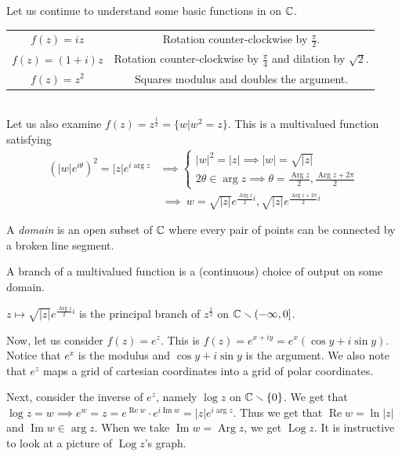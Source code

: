 \documentclass[11pt,leqno,oneside]{amsart}
\newcommand{\Arg}{\operatorname{Arg}}
\newcommand{\Log}{\operatorname{Log}}
\renewcommand{\Re}{\operatorname{Re}}
\renewcommand{\Im}{\operatorname{Im}}
\begin{document}
Let us continue to understand some basic functions in on ${\mathbb C}$. \\
\begin{tabular}{|c|c|}
    \hline
    $f(z) = iz$ & Rotation counter-clockwise by $\frac{\pi}{2}$. \\
    $f(z) = (1+i)z$ & Rotation counter-clockwise by $\frac{\pi}{4}$ and dilation by $\sqrt{2}$. \\
    $f(z) = z^2$ & Squares modulus and doubles the argument. \\
   \hline
\end{tabular} \\
Let us also examine $f(z) = z^{\frac{1}{2}} = \{w | w^2=z\}$. This is a multivalued function satisfying
\begin{align*}
    (|w|e^{i\theta})^2 = |z|e^{i \arg z} & \implies \begin{cases}
        |w|^2 = |z| \implies |w| = \sqrt{|z|} \\
        2\theta \in \arg z \implies \theta = \frac{\Arg z}{2}, \frac{\Arg z + 2\pi}{2}
    \end{cases} \\
    \ & \ \implies \ w = \sqrt{|z|}e^{\frac{\Arg z}{2}i}, \sqrt{|z|}e^{\frac{\Arg z + 2\pi}{2} i}
\end{align*}
\begin{defn}
    A \emph{domain} is an open subset of ${\mathbb C}$ where every pair of points can be connected by a broken line segment.
\end{defn}
\begin{defn}
    A branch of a multivalued function is a (continuous) choice of output on some domain.
\end{defn}
\begin{example}
    $z \mapsto \sqrt{|z|}e^{\frac{\Arg z}{2}i}$ is the principal branch of
    $z^{\frac{1}{2}}$ on ${\mathbb C} \smallsetminus (-\infty,0]$.
\end{example}

Now, let us consider $f(z) = e^z$. This is $f(z) = e^{x+iy} = e^x(\cos y +
i\sin y)$. Notice that $e^x$ is the modulus and $\cos y + i \sin y$ is the
argument. We also note that $e^z$ maps a grid of cartesian coordinates into a
grid of polar coordinates.

Next, consider the inverse of $e^z$, namely $\log z$ on ${\mathbb C} \smallsetminus
\{0\}$. We get that $\log z = w \implies e^w = z = e^{\Re w} \cdot e^{i \Im w}
= |z|e^{i \arg z}$. Thus we get that $\Re w = \ln|z|$ and $\Im w \in \arg z$.
When we take $\Im w = \Arg z$, we get $\Log z$. It is instructive to look at a
picture of $\Log z$'s graph.
\end{document}
